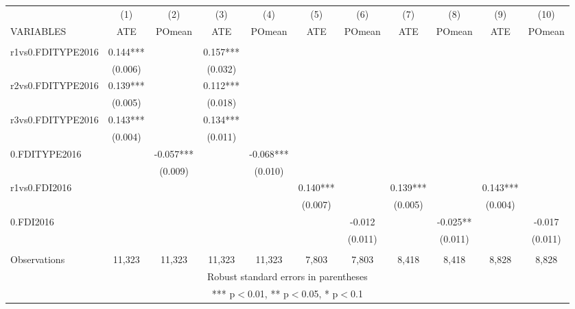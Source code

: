 \documentclass[]{article}
\begin{document}
\begin{tabular}{lcccccccccc} \hline
 & (1) & (2) & (3) & (4) & (5) & (6) & (7) & (8) & (9) & (10) \\
VARIABLES & ATE & POmean & ATE & POmean & ATE & POmean & ATE & POmean & ATE & POmean \\ \hline
 &  &  &  &  &  &  &  &  &  &  \\
r1vs0.FDITYPE2016 & 0.144*** &  & 0.157*** &  &  &  &  &  &  &  \\
 & (0.006) &  & (0.032) &  &  &  &  &  &  &  \\
r2vs0.FDITYPE2016 & 0.139*** &  & 0.112*** &  &  &  &  &  &  &  \\
 & (0.005) &  & (0.018) &  &  &  &  &  &  &  \\
r3vs0.FDITYPE2016 & 0.143*** &  & 0.134*** &  &  &  &  &  &  &  \\
 & (0.004) &  & (0.011) &  &  &  &  &  &  &  \\
0.FDITYPE2016 &  & -0.057*** &  & -0.068*** &  &  &  &  &  &  \\
 &  & (0.009) &  & (0.010) &  &  &  &  &  &  \\
r1vs0.FDI2016 &  &  &  &  & 0.140*** &  & 0.139*** &  & 0.143*** &  \\
 &  &  &  &  & (0.007) &  & (0.005) &  & (0.004) &  \\
0.FDI2016 &  &  &  &  &  & -0.012 &  & -0.025** &  & -0.017 \\
 &  &  &  &  &  & (0.011) &  & (0.011) &  & (0.011) \\
 &  &  &  &  &  &  &  &  &  &  \\
 Observations & 11,323 & 11,323 & 11,323 & 11,323 & 7,803 & 7,803 & 8,418 & 8,418 & 8,828 & 8,828 \\ \hline
\multicolumn{11}{c}{ Robust standard errors in parentheses} \\
\multicolumn{11}{c}{ *** p$<$0.01, ** p$<$0.05, * p$<$0.1} \\
\end{tabular}
\end{document}
